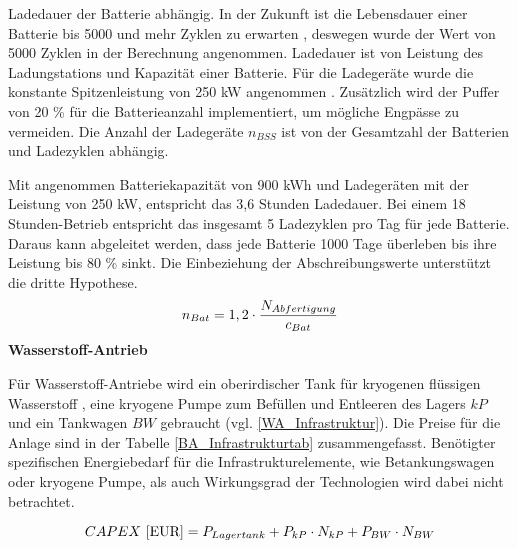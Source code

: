 Ladedauer der Batterie abhängig. In der Zukunft ist die Lebensdauer einer Batterie bis 5000 und mehr Zyklen zu erwarten \cite{reimers2018introduction}, 
deswegen wurde der Wert von 5000 Zyklen in der Berechnung angenommen.
Ladedauer ist von Leistung des Ladungstations und Kapazität einer Batterie.
Für die Ladegeräte wurde die konstante Spitzenleistung von 250 kW angenommen \cite{salucci2020optimal}. %
Zusätzlich wird der Puffer von 20 \% für die Batterieanzahl implementiert, um mögliche Engpässe zu vermeiden. 
Die Anzahl der Ladegeräte $n_{BSS}$ ist von der Gesamtzahl der Batterien und Ladezyklen abhängig.

Mit angenommen Batteriekapazität von 900 kWh und Ladegeräten mit der Leistung von 250 kW, entspricht das 3,6 Stunden Ladedauer.
Bei einem 18 Stunden-Betrieb entspricht das insgesamt 5 Ladezyklen pro Tag für jede Batterie. Daraus kann abgeleitet werden, dass
jede Batterie 1000 Tage überleben bis ihre Leistung bis 80 \% sinkt.
Die Einbeziehung der Abschreibungswerte unterstützt die dritte Hypothese.
%
\begin{equation}
  {n_{Bat}} = {1,2} \cdot \frac{N_{Abfertigung}}{c_{Bat}}\\
  \label{BatAnzahl}
  \end{equation}
\textbf{Wasserstoff-Antrieb}
%

Für Wasserstoff-Antriebe wird ein oberirdischer Tank für kryogenen flüssigen Wasserstoff , 
eine kryogene Pumpe zum Befüllen und Entleeren des Lagers ${kP}$ und ein Tankwagen ${BW}$ gebraucht (vgl. \eqref{WA_Infrastruktur}). 
Die Preise für die Anlage sind in der Tabelle \ref{BA_Infrastrukturtab} zusammengefasst. 
%
Benötigter spezifischen Energiebedarf für die Infrastrukturelemente, wie Betankungswagen oder kryogene Pumpe, 
als auch Wirkungsgrad der Technologien wird dabei nicht betrachtet.

\begin{equation}
   {CAPEX ~[\text{EUR}]} = {P_{Lagertank}} + P_{kP} \cdot N_{kP} + P_{BW} \cdot N_{BW}  \\
   \label{WA_Infrastruktur}
\end{equation}

